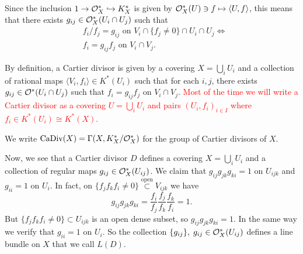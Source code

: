 Since the inclusion $1\to \mathcal{O}_X^*\hookrightarrow K_X^*$ is given by $\mathcal{O}_X^*(U)\ni f\mapsto \langle U,f\rangle$, 
this means that there exists $g_{ij}\in\mathcal{O}_X^*(U_i\cap U_j)$ such that 
\begin{equation}
    \begin{split}
        &f_i/f_j = g_{ij} \text{ on } V_i\cap\{f_j\neq0\}\cap U_i\cap U_j\iff\\
        &f_i = g_{ij}f_j \text{ on }V_i\cap V_j.
    \end{split}
\end{equation}

\begin{dang}
\begin{corollary}
    By definition, a Cartier divisor is given by a covering $X=\bigcup_i U_i$ and a collection of rational maps 
    $\langle V_i, f_i\rangle \in K^*(U_i)$ such that for each $i,j$, there exists 
    $g_{ij}\in\mathcal{O}^*(U_i\cap U_j)$ such that $f_i = g_{ij}f_j$ on $V_i\cap V_j$. 
    \textcolor{red}{Most of the time we will write a Cartier divisor as a covering 
    $U=\bigcup_i U_i$ and pairs $(U_i,f_i)_{i\in I}$ where $f_i\in K^*(U_i)\cong K^*(X)$.}
\end{corollary}
\end{dang}

\begin{notation}
We write $\text{CaDiv}(X)=\Gamma(X,K_X^*/\mathcal{O}_X^*)$ for the group of Cartier divisors of $X$.
\end{notation}

Now, we see that a Cartier divisor $D$ defines a covering $X=\bigcup_i U_i$ and a collection of regular maps 
$g_{ij}\in\mathcal{O}_X^*(U_{ij})$. We claim that $g_{ij}g_{jk}g_{ki}=1$ on $U_{ijk}$ and $g_{ii}=1$ on $U_i$. 
In fact, on $\{f_jf_kf_i\neq0\}\overset{\text{open}}{\subset} V_{ijk}$ we have 
\begin{equation}
    g_{ij}g_{jk}g_{ki} = \frac{f_i}{f_j}\frac{f_j}{f_k}\frac{f_k}{f_i} = 1.
\end{equation}
But $\{f_jf_kf_i\neq0\}\subset U_{ijk}$ is an open dense subset, so $g_{ij}g_{jk}g_{ki}=1$. In the same way 
we verify that $g_{ii}=1$ on $U_i$. So the collection $\{g_{ij}\},\; g_{ij}\in\mathcal{O}_X^*(U_{ij})$ 
defines a line bundle on $X$ that we call $L(D)$.


